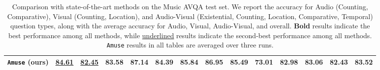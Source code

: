 \documentclass[11pt]{article}
\begin{document}
\begin{table}[htbp]
{\begin{tabular}{@{}l|ccc|ccc|cccccc|c@{}}
\\ \midrule
\textbf{\texttt{Amuse} (ours)}                         & \underline{84.61} & \underline{82.45}          & \textbf{83.58} & \textbf{87.14} & \textbf{84.39} & \textbf{85.84} & \textbf{86.95} & \textbf{85.49} & 73.01          & \textbf{82.98} & \textbf{83.06} & \textbf{82.43} & \textbf{83.52}                \\ \bottomrule
\end{tabular}
}
\vspace{-0.1cm}
\caption{Comparison with state-of-the-art methods on the Music AVQA \cite{li2022learning} test set. We report the accuracy for Audio (Counting, Comparative), Visual (Counting, Location), and Audio-Visual (Existential, Counting, Location, Comparative, Temporal) question types, along with the average accuracy for Audio, Visual, Audio-Visual, and overall. \textbf{Bold} results indicate the best performance among {all} methods, while \underline{underlined} results indicate the second-best performance among {all} methods. \texttt{Amuse} results in all tables are averaged over three runs.}
\label{tab:tab1}
\end{table}
\end{document}
